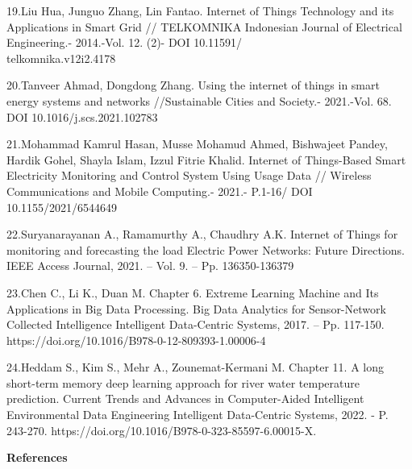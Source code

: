 \begin{noparindent}
19.Liu Hua, Junguo Zhang, Lin Fantao. Internet of Things Technology and
its Applications in Smart Grid // TELKOMNIKA Indonesian Journal of
Electrical Engineering.- 2014.-Vol. 12. (2)- DOI
10.11591/\\telkomnika.v12i2.4178

20.Tanveer Ahmad, Dongdong Zhang. Using the internet of things in smart
energy systems and networks //Sustainable Cities and Society.-
2021.-Vol. 68. DOI 10.1016/j.scs.2021.102783

21.Mohammad Kamrul Hasan, Musse Mohamud Ahmed, Bishwajeet Pandey, Hardik
Gohel, Shayla Islam, Izzul Fitrie Khalid. Internet of Things-Based Smart
Electricity Monitoring and Control System Using Usage Data // Wireless
Communications and Mobile Computing.- 2021.- P.1-16/ DOI 10.1155/2021/6544649

22.Suryanarayanan A., Ramamurthy A., Chaudhry A.K. Internet of Things
for monitoring and forecasting the load Electric Power Networks: Future
Directions. IEEE Access Journal, 2021. -- Vol. 9. -- Pp. 136350-136379

23.Chen C., Li K., Duan M. Chapter 6. Extreme Learning Machine and Its
Applications in Big Data Processing. Big Data Analytics for
Sensor-Network Collected Intelligence Intelligent Data-Centric Systems,
2017. -- Pp. 117-150. https://doi.org/10.1016/B978-0-12-809393-1.00006-4

24.Heddam S., Kim S., Mehr A., Zounemat-Kermani M. Chapter 11. A long
short-term memory deep learning approach for river water temperature
prediction. Current Trends and Advances in Computer-Aided Intelligent
Environmental Data Engineering Intelligent Data-Centric Systems, 2022. -
P. 243-270. https://doi.org/10.1016/B978-0-323-85597-6.00015-X.

\end{noparindent}

\begin{center}
  {\bfseries References}
  \end{center}


